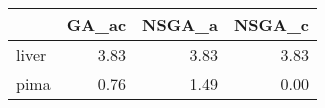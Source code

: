 \begin{tabular}{lrrr}
\toprule
{} &  GA\_ac &  NSGA\_a &  NSGA\_c \\
\midrule
liver &   3.83 &    3.83 &    3.83 \\
pima  &   0.76 &    1.49 &    0.00 \\
\bottomrule
\end{tabular}
